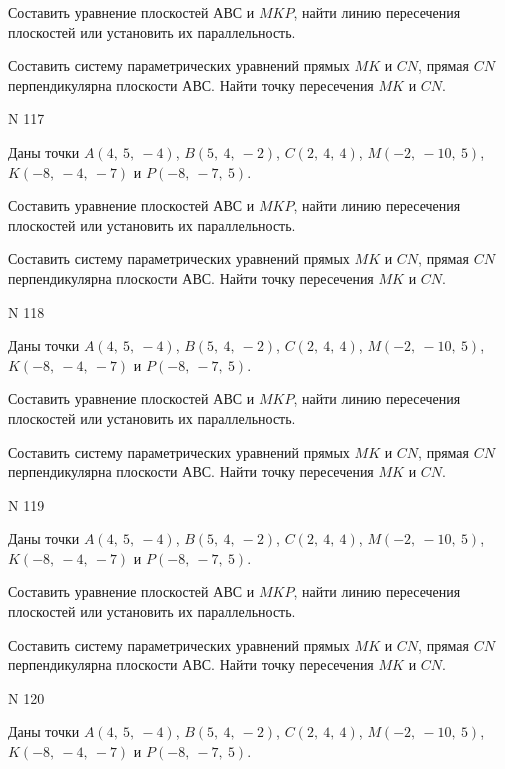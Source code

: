 \documentclass[11pt]{report}
\begin{document}
Составить уравнение плоскостей $АВС$ и $MKP$,
найти линию пересечения плоскостей или установить их параллельность.

Составить систему параметрических уравнений прямых $MK$ и $CN$,
прямая $CN$ перпендикулярна плоскости $АВС$. 
Найти точку пересечения $MK$ и $CN$.



 N 117

Даны точки $A\left( 4, \  5, \  -4\right)$, $B\left( 5, \  4, \  -2\right)$, $C\left( 2, \  4, \  4\right)$, $M\left( -2, \  -10, \  5\right)$, $K\left( -8, \  -4, \  -7\right)$ и $P\left( -8, \  -7, \  5\right)$.


Составить уравнение плоскостей $АВС$ и $MKP$,
найти линию пересечения плоскостей или установить их параллельность.

Составить систему параметрических уравнений прямых $MK$ и $CN$,
прямая $CN$ перпендикулярна плоскости $АВС$. 
Найти точку пересечения $MK$ и $CN$.



 N 118

Даны точки $A\left( 4, \  5, \  -4\right)$, $B\left( 5, \  4, \  -2\right)$, $C\left( 2, \  4, \  4\right)$, $M\left( -2, \  -10, \  5\right)$, $K\left( -8, \  -4, \  -7\right)$ и $P\left( -8, \  -7, \  5\right)$.


Составить уравнение плоскостей $АВС$ и $MKP$,
найти линию пересечения плоскостей или установить их параллельность.

Составить систему параметрических уравнений прямых $MK$ и $CN$,
прямая $CN$ перпендикулярна плоскости $АВС$. 
Найти точку пересечения $MK$ и $CN$.



 N 119

Даны точки $A\left( 4, \  5, \  -4\right)$, $B\left( 5, \  4, \  -2\right)$, $C\left( 2, \  4, \  4\right)$, $M\left( -2, \  -10, \  5\right)$, $K\left( -8, \  -4, \  -7\right)$ и $P\left( -8, \  -7, \  5\right)$.


Составить уравнение плоскостей $АВС$ и $MKP$,
найти линию пересечения плоскостей или установить их параллельность.

Составить систему параметрических уравнений прямых $MK$ и $CN$,
прямая $CN$ перпендикулярна плоскости $АВС$. 
Найти точку пересечения $MK$ и $CN$.



 N 120

Даны точки $A\left( 4, \  5, \  -4\right)$, $B\left( 5, \  4, \  -2\right)$, $C\left( 2, \  4, \  4\right)$, $M\left( -2, \  -10, \  5\right)$, $K\left( -8, \  -4, \  -7\right)$ и $P\left( -8, \  -7, \  5\right)$.
\end{document}
